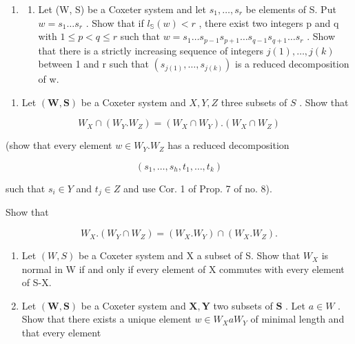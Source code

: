 
\begin{enumerate}
\def\labelenumi{\arabic{enumi})}
\tightlist
\item
  \begin{enumerate}
  \def\labelenumii{\alph{enumii})}
  \tightlist
  \item
    Let (W, S) be a Coxeter system and let \(s_{1}, \ldots, s_{r}\) be elements of S. Put \(w = s_{1} \ldots s_{r}\) . Show that if \(l_{\mathbb{S}}(w) < r\) , there exist two integers p and q with \(1 \leqslant p < q \leqslant r\) such that \(w = s_{1} \ldots s_{p-1}s_{p+1} \ldots s_{q-1}s_{q+1} \ldots s_{r}\) . Show that there is a strictly increasing sequence of integers \(j(1), \ldots, j(k)\) between 1 and r such that \((s_{j(1)}, \ldots, s_{j(k)})\) is a reduced decomposition of w.
  \end{enumerate}
\end{enumerate}

\begin{enumerate}
\def\labelenumi{\alph{enumi})}
\setcounter{enumi}{1}
\tightlist
\item
  Let \((\mathbf{W},\mathbf{S})\) be a Coxeter system and \(X,Y,Z\) three subsets of \(S\) . Show that
\end{enumerate}

\[
W _ {X} \cap (W _ {Y}. W _ {Z}) = (W _ {X} \cap W _ {Y}). (W _ {X} \cap W _ {Z})
\]

(show that every element \(w \in W_{Y}.W_{Z}\) has a reduced decomposition

\[
(s _ {1}, \ldots , s _ {h}, t _ {1}, \ldots , t _ {k})
\]

such that \(s_i \in Y\) and \(t_j \in Z\) and use Cor. 1 of Prop. 7 of no. 8).

Show that

\[
W _ {X}. \left(W _ {Y} \cap W _ {Z}\right) = \left(W _ {X}. W _ {Y}\right) \cap \left(W _ {X}. W _ {Z}\right).
\]

\begin{enumerate}
\def\labelenumi{\arabic{enumi})}
\setcounter{enumi}{1}
\item
  Let \((W,S)\) be a Coxeter system and X a subset of S. Show that \(W_{X}\) is normal in W if and only if every element of X commutes with every element of S-X.
\item
  Let \((\mathbf{W},\mathbf{S})\) be a Coxeter system and \(\mathbf{X},\mathbf{Y}\) two subsets of \(\mathbf{S}\) . Let \(a\in W\) . Show that there exists a unique element \(w\in W_X a W_Y\) of minimal length and that every element
\end{enumerate}

